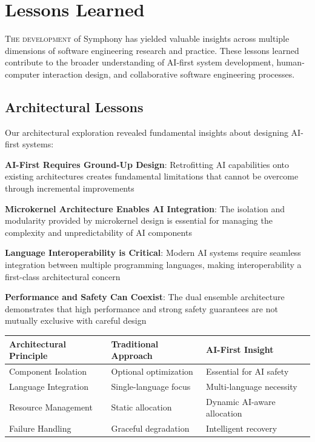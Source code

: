 
\section*{Lessons Learned}

\lettrine{T}{he development} of Symphony has yielded valuable insights across multiple dimensions of software engineering research and practice. These lessons learned contribute to the broader understanding of AI-first system development, human-computer interaction design, and collaborative software engineering processes.

\subsection*{Architectural Lessons}

Our architectural exploration revealed fundamental insights about designing AI-first systems:

\begin{expandedlist}
    \item \textbf{AI-First Requires Ground-Up Design}: Retrofitting AI capabilities onto existing architectures creates fundamental limitations that cannot be overcome through incremental improvements
    \item \textbf{Microkernel Architecture Enables AI Integration}: The isolation and modularity provided by microkernel design is essential for managing the complexity and unpredictability of AI components
    \item \textbf{Language Interoperability is Critical}: Modern AI systems require seamless integration between multiple programming languages, making interoperability a first-class architectural concern
    \item \textbf{Performance and Safety Can Coexist}: The dual ensemble architecture demonstrates that high performance and strong safety guarantees are not mutually exclusive with careful design
\end{expandedlist}

\begin{center}
\begin{tabular}{@{}lll@{}}
\toprule
\textbf{Architectural Principle} & \textbf{Traditional Approach} & \textbf{AI-First Insight} \\
\midrule
Component Isolation & Optional optimization & Essential for AI safety \\
Language Integration & Single-language focus & Multi-language necessity \\
Resource Management & Static allocation & Dynamic AI-aware allocation \\
Failure Handling & Graceful degradation & Intelligent recovery \\
\bottomrule
\end{tabular}
\end{center}

